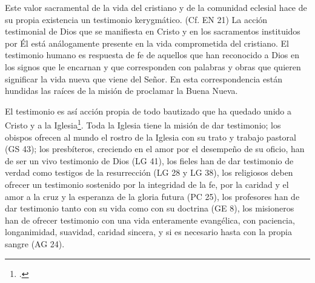 Este valor sacramental de la vida del cristiano y de la comunidad eclesial hace de su propia existencia un testimonio kerygmático. (Cf. EN 21)
La acción testimonial de Dios que se manifiesta en Cristo y en los sacramentos instituidos por Él está análogamente presente en la vida comprometida del cristiano. El testimonio humano es respuesta de fe de aquellos que han reconocido a Dios en los signos que le encarnan y que corresponden con palabras y obras que quieren significar la vida nueva que viene del Señor. En esta correspondencia están hundidas las raíces de la misión de proclamar la Buena Nueva.

El testimonio es así acción propia de todo bautizado que ha quedado unido a Cristo y a la Iglesia\footcite[Cf.][188]{prades2015testimonio}. Toda la Iglesia tiene la misión de dar testimonio; los obispos ofrecen al mundo el rostro de la Iglesia con su trato y trabajo pastoral (GS 43); los presbíteros, creciendo en el amor por el desempeño de su oficio, han de ser un vivo testimonio de Dios (LG 41), los fieles han de dar testimonio de verdad como testigos de la resurrección (LG 28 y LG 38), los religiosos deben ofrecer un testimonio sostenido por la integridad de la fe, por la caridad y el amor a la cruz y la esperanza de la gloria futura (PC 25), los profesores han de dar testimonio tanto con su vida como con su doctrina (GE 8), los misioneros han de ofrecer testimonio con una vida enteramente evangélica, con paciencia, longanimidad, suavidad, caridad sincera, y si es necesario hasta con la propia sangre (AG 24).

